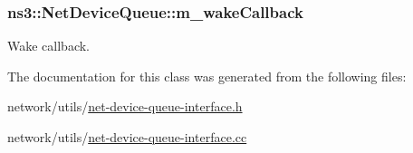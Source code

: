 \subsubsection[{\texorpdfstring{m\+\_\+wake\+Callback}{m_wakeCallback}}]{ ns3\+::\+Net\+Device\+Queue\+::m\+\_\+wake\+Callback\hspace{0.3cm}{\ttfamily [private]}}\hypertarget{classns3_1_1NetDeviceQueue_abfc6b3a5c3cbbd967400751e7184b2d7}{}\label{classns3_1_1NetDeviceQueue_abfc6b3a5c3cbbd967400751e7184b2d7}


Wake callback. 



The documentation for this class was generated from the following files\+:\begin{DoxyCompactItemize}
\item 
network/utils/\hyperlink{net-device-queue-interface_8h}{net-\/device-\/queue-\/interface.\+h}\item 
network/utils/\hyperlink{net-device-queue-interface_8cc}{net-\/device-\/queue-\/interface.\+cc}\end{DoxyCompactItemize}
